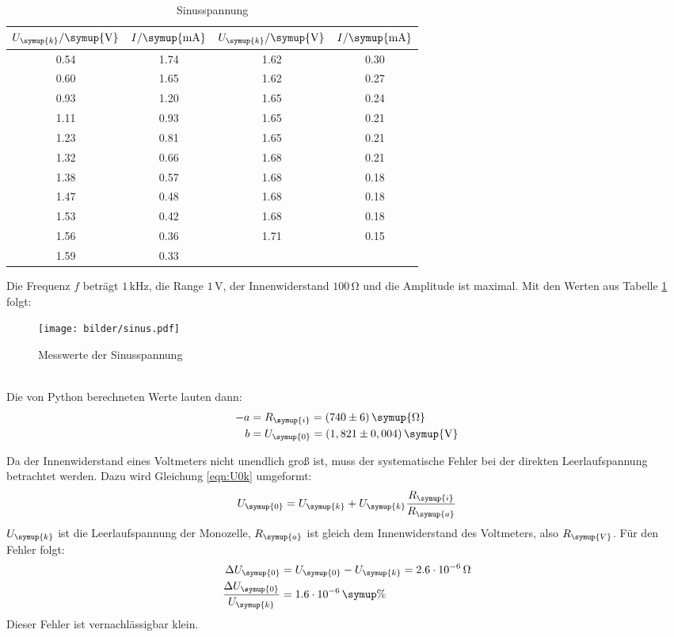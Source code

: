 \begin{table}[H]
  \centering
  \begin{tabular}{c c c c}
    \toprule
    $U_{\symup{k}}/\symup{\si{\volt}}$ & $I/\symup{\si{\milli\ampere}}$  &
    $U_{\symup{k}}/\symup{\si{\volt}}$ & $I/\symup{\si{\milli\ampere}}$  \\
    \midrule
    0.54   &  1.74  &  1.62  &  0.30  \\
    0.60   &  1.65  &  1.62  &  0.27  \\
    0.93   &  1.20  &  1.65  &  0.24  \\
    1.11   &  0.93  &  1.65  &  0.21  \\
    1.23   &  0.81  &  1.65  &  0.21  \\
    1.32   &  0.66  &  1.68  &  0.21  \\
    1.38   &  0.57  &  1.68  &  0.18  \\
    1.47   &  0.48  &  1.68  &  0.18  \\
    1.53   &  0.42  &  1.68  &  0.18  \\
    1.56   &  0.36  &  1.71  &  0.15  \\
    1.59   &  0.33  &  \hrulefill  & \hrulefill  \\
    \bottomrule
  \end{tabular}
  \caption{Sinusspannung}
  \label{tab:sin}
\end{table}
Die Frequenz $f$ beträgt $1\,\si{\kilo\hertz}$, die Range $1\,\si{\volt}$, der
Innenwiderstand $100\,\si{\ohm}$ und die Amplitude ist maximal.
Mit den Werten aus Tabelle \ref{tab:sin} folgt:
\begin{figure}[h]
  \centering
  \texttt{[image: bilder/sinus.pdf]}
  \caption{Messwerte der Sinusspannung}
  \label{fig:si}
\end{figure}
\\
Die von Python berechneten Werte lauten dann:
\begin{align*}
   -a &= R_\symup{i} = (740 \pm 6)\, \symup{\si{\ohm}} \\
   b &= U_\symup{0} = (1,821 \pm 0,004)\,\symup{\si{\volt}}
\end{align*}

Da der Innenwiderstand eines Voltmeters nicht unendlich groß ist, muss der systematische
Fehler bei der direkten Leerlaufspannung betrachtet werden. Dazu wird Gleichung
\eqref{eqn:U0k} umgeformt:
\begin{equation}
  U_\symup{0} = U_\symup{k} + U_\symup{k} \frac{R_\symup{i}}{R_\symup{a}}
\end{equation}
$U_\symup{k}$ ist die Leerlaufspannung der Monozelle, $R_\symup{a}$ ist gleich dem
Innenwiderstand des Voltmeters, also $R_\symup{V}$.
Für den Fehler folgt:
\begin{align*}
  \Delta U_\symup{0} &= U_\symup{0} - U_\symup{k} = 2.6 \cdot 10^{-6} \,\si{\ohm} \\
  \frac{\Delta U_\symup{0}}{U_\symup{k}} &= 1.6 \cdot 10^{-6} \, \symup{\%}
\end{align*}
Dieser Fehler ist vernachlässigbar klein.


